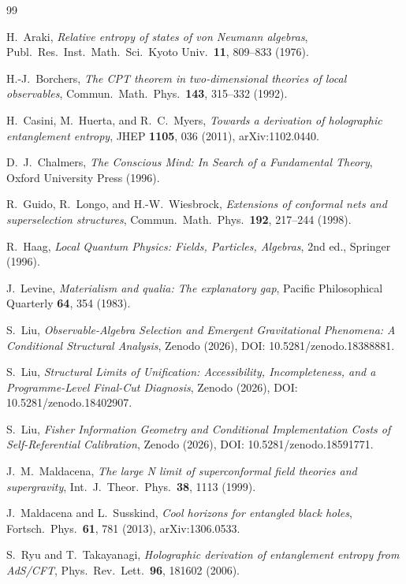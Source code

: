 \documentclass[12pt]{article}
\theoremstyle{definition}
\theoremstyle{remark}
\begin{document}
\begin{thebibliography}{99}

H.~Araki,
\emph{Relative entropy of states of von Neumann algebras},
Publ.\ Res.\ Inst.\ Math.\ Sci.\ Kyoto Univ.\ \textbf{11}, 809--833 (1976).

H.-J.~Borchers,
\emph{The CPT theorem in two-dimensional theories of local observables},
Commun.\ Math.\ Phys.\ \textbf{143}, 315--332 (1992).

H.~Casini, M.~Huerta, and R.~C.~Myers,
\emph{Towards a derivation of holographic entanglement entropy},
JHEP \textbf{1105}, 036 (2011),
arXiv:1102.0440.

D.~J.~Chalmers,
\emph{The Conscious Mind: In Search of a Fundamental Theory},
Oxford University Press (1996).

R.~Guido, R.~Longo, and H.-W.~Wiesbrock,
\emph{Extensions of conformal nets and superselection structures},
Commun.\ Math.\ Phys.\ \textbf{192}, 217--244 (1998).

R.~Haag,
\emph{Local Quantum Physics: Fields, Particles, Algebras},
2nd ed., Springer (1996).

J.~Levine,
\emph{Materialism and qualia: The explanatory gap},
Pacific Philosophical Quarterly \textbf{64}, 354 (1983).

S.~Liu, \emph{Observable-Algebra Selection and Emergent Gravitational Phenomena: A Conditional Structural Analysis}, Zenodo (2026), DOI: 10.5281/zenodo.18388881.

S.~Liu, \emph{Structural Limits of Unification: Accessibility, Incompleteness, and a Programme-Level Final-Cut Diagnosis}, Zenodo (2026), DOI: 10.5281/zenodo.18402907.

S.~Liu, \emph{Fisher Information Geometry and Conditional Implementation Costs of Self-Referential Calibration}, Zenodo (2026), DOI: 10.5281/zenodo.18591771.

J.~M.~Maldacena,
\emph{The large N limit of superconformal field theories and supergravity},
Int.\ J.\ Theor.\ Phys.\ \textbf{38}, 1113 (1999).

J.~Maldacena and L.~Susskind,
\emph{Cool horizons for entangled black holes},
Fortsch.\ Phys.\ \textbf{61}, 781 (2013),
arXiv:1306.0533.

S.~Ryu and T.~Takayanagi,
\emph{Holographic derivation of entanglement entropy from AdS/CFT},
Phys.\ Rev.\ Lett.\ \textbf{96}, 181602 (2006).


\end{thebibliography}
\end{document}
